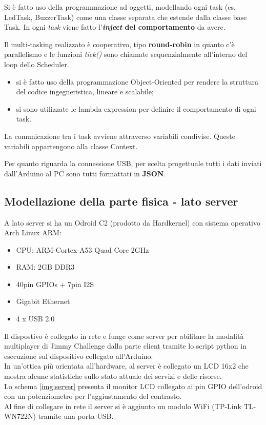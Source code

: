 Si è fatto uso della programmazione ad oggetti, modellando ogni task (es. LedTask, BuzzerTask) come una classe separata che estende dalla classe base Task. In ogni \textit{task} viene fatto l'\textbf{\textit{inject} del comportamento} da avere.

Il multi-tasking realizzato è cooperativo, tipo \textbf{round-robin} in quanto c'è parallelismo e le funzioni \textit{tick()} sono chiamate sequenzialmente all'interno del loop dello Scheduler.

\begin{itemize}	
	\item si è fatto uso della programmazione Object-Oriented per rendere la struttura del codice ingegneristica, lineare e scalabile;
	\item si sono utilizzate le lambda expression per definire il comportamento di ogni task.
\end{itemize}



La comunicazione tra i task avviene attraverso variabili condivise. Queste variabili appartengono alla classe Context.

Per quanto riguarda la connessione USB, per scelta progettuale tutti i dati inviati dall'Arduino al PC sono tutti formattati in \textbf{JSON}.

\subsection{Modellazione della parte fisica - lato server}
A lato server si ha un Odroid C2 (prodotto da Hardkernel) con sistema operativo Arch Linux ARM:
\begin{itemize}
	\item CPU: ARM Cortex-A53 Quad Core 2GHz
	\item RAM: 2GB DDR3
	\item 40pin GPIOs + 7pin I2S
	\item Gigabit Ethernet
	\item 4 x USB 2.0
\end{itemize}
Il dispostivo è collegato in rete e funge come server per abilitare la modalità multiplayer di Jimmy Challenge dalla parte client tramite lo script python in esecuzione sul dispositivo collegato all'Arduino.\\
In un'ottica più orientata all'hardware, al server è collegato un LCD 16x2 che mostra alcune statistiche sullo stato attuale dei servizi e delle risorse.\\
Lo schema \ref{img:server} presenta il monitor LCD collegato ai pin GPIO dell'odroid con un potenziometro per l'aggiustamento del contrasto.\\
Al fine di collegare in rete il server si è aggiunto un modulo WiFi (TP-Link TL-WN722N) tramite una porta USB.

